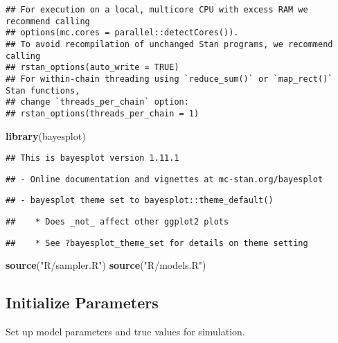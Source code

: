 \documentclass[
]{article}
\newenvironment{Shaded}{\begin{snugshade}}{\end{snugshade}}
\newcommand{\FunctionTok}[1]{\textcolor[rgb]{0.13,0.29,0.53}{\textbf{#1}}}
\newcommand{\NormalTok}[1]{#1}
\newcommand{\StringTok}[1]{\textcolor[rgb]{0.31,0.60,0.02}{#1}}
\begin{document}
\begin{verbatim}
## For execution on a local, multicore CPU with excess RAM we recommend calling
## options(mc.cores = parallel::detectCores()).
## To avoid recompilation of unchanged Stan programs, we recommend calling
## rstan_options(auto_write = TRUE)
## For within-chain threading using `reduce_sum()` or `map_rect()` Stan functions,
## change `threads_per_chain` option:
## rstan_options(threads_per_chain = 1)
\end{verbatim}

\begin{Shaded}
\begin{Highlighting}[]
\FunctionTok{library}\NormalTok{(bayesplot)}
\end{Highlighting}
\end{Shaded}

\begin{verbatim}
## This is bayesplot version 1.11.1
\end{verbatim}

\begin{verbatim}
## - Online documentation and vignettes at mc-stan.org/bayesplot
\end{verbatim}

\begin{verbatim}
## - bayesplot theme set to bayesplot::theme_default()
\end{verbatim}

\begin{verbatim}
##    * Does _not_ affect other ggplot2 plots
\end{verbatim}

\begin{verbatim}
##    * See ?bayesplot_theme_set for details on theme setting
\end{verbatim}

\begin{Shaded}
\begin{Highlighting}[]
\FunctionTok{source}\NormalTok{(}\StringTok{"R/sampler.R"}\NormalTok{)}
\FunctionTok{source}\NormalTok{(}\StringTok{"R/models.R"}\NormalTok{)}
\end{Highlighting}
\end{Shaded}

\subsection{Initialize Parameters}\label{initialize-parameters}

Set up model parameters and true values for simulation.
\end{document}
